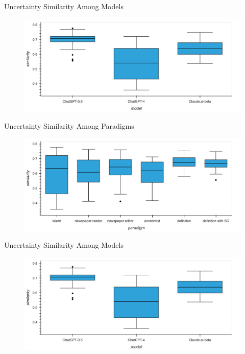 \documentclass[12pt]{beamer}
\begin{document}
\begin{frame}{Uncertainty Similarity Among Models}
\begin{figure}[H]
\centering
\includegraphics[width=11.5cm]{Figures/fig25.png}
\end{figure}
\end{frame}


\begin{frame}{Uncertainty Similarity Among Paradigms}
\begin{figure}[H]
\centering
\includegraphics[width=11.5cm]{Figures/fig26.png}
\end{figure}
\end{frame}


\begin{frame}{Uncertainty Similarity Among Models}
\begin{figure}[H]
\centering
\includegraphics[width=11.5cm]{Figures/fig25.png}
\end{figure}
\end{frame}
\end{document}
